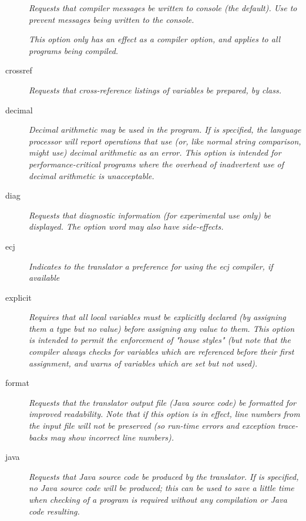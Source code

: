 \begin{description}
\emph{Requests that compiler messages be written to console (the default).
Use  to prevent messages being written to the
console.}
 
\emph{This option only has an effect as a compiler option, and applies to all
programs being compiled.}
\item[crossref]
\emph{Requests that cross-reference listings of variables be prepared,
by class.}
\item[decimal]

\emph{Decimal arithmetic may be used in the program.  If  is
specified, the language processor will report operations that use (or,
like normal string comparison, might use) decimal arithmetic as an
error.  This option is intended for performance-critical programs where
the overhead of inadvertent use of decimal arithmetic is
unacceptable.}
\item[diag]
\emph{Requests that diagnostic information (for experimental use only)
be displayed.
The  option word may also have side-effects.}

\item[ecj]
\emph{Indicates to the translator a preference for using the
  \emph{ecj} compiler, if available}


\item[explicit]

\emph{Requires that all local variables must be explicitly declared (by
assigning them a type but no value) before assigning any value to them.
This option is intended to permit the enforcement of "house styles"
(but note that the \nr{} compiler always checks for variables which
are referenced before their first assignment, and warns of variables
which are set but not used).}
\item[format]
\emph{Requests that the translator output file (Java source code) be
formatted for improved readability.
Note that if this option is in effect, line numbers from the input file
will not be preserved (so run-time errors and exception trace-backs may
show incorrect line numbers).}
\item[java]

\emph{Requests that Java source code be produced by the translator.
If  is specified, no Java source code will be produced;
this can be used to save a little time when checking of a program is
required without any compilation or Java code resulting.}


\end{description}
